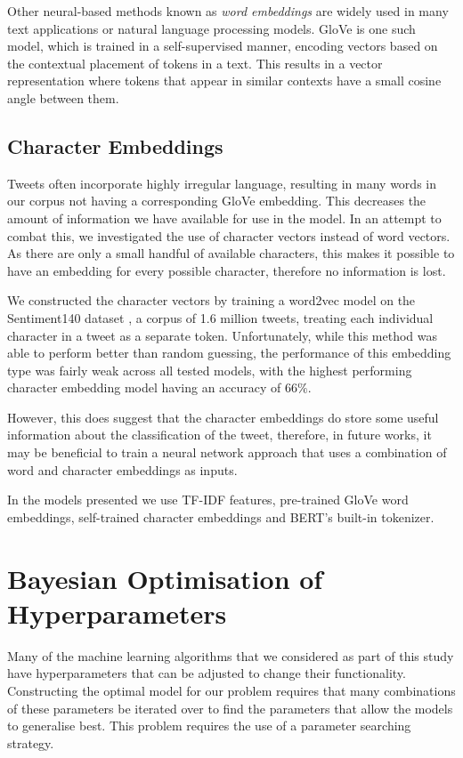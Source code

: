 \documentclass[journal, ]{IEEEtran}
\let\MYoriglatexcaption\caption
\renewcommand{\caption}[2][\relax]{\MYoriglatexcaption[#2]{#2}}
\begin{document}
Other neural-based methods known as \textit{word embeddings} are widely used in many text applications or natural language processing models. GloVe \cite{pennington2014} is one such model,  which is trained in a self-supervised manner, encoding vectors based on the contextual placement of tokens in a text. This results in a vector representation where tokens that appear in similar contexts have a small cosine angle between them. 


\subsection{Character Embeddings}
Tweets often incorporate highly irregular language, resulting in many words in our corpus not having a corresponding GloVe embedding. This decreases the amount of information we have available for use in the model. In an attempt to combat this, we investigated the use of character vectors instead of word vectors. As there are only a small handful of available characters, this makes it possible to have an embedding for every possible character, therefore no information is lost.

We constructed the character vectors by training a word2vec model on the Sentiment140 dataset \cite{go2009twitter}, a corpus of 1.6 million tweets, treating each individual character in a tweet as a separate token. Unfortunately, while this method was able to perform better than random guessing, the performance of this embedding type was fairly weak across all tested models, with the highest performing character embedding model having an accuracy of $66\%$. 

However, this does suggest that the character embeddings do store some useful information about the classification of the tweet, therefore, in future works, it may be beneficial to train a neural network approach that uses a combination of word and character embeddings as inputs.

In the models presented we use TF-IDF features, pre-trained GloVe word embeddings, self-trained character embeddings and BERT's built-in tokenizer.

\section{Bayesian Optimisation of Hyperparameters}
Many of the machine learning algorithms that we considered as part of this study have hyperparameters that can be adjusted to change their functionality. Constructing the optimal model for our problem requires that many combinations of these parameters be iterated over to find the parameters that allow the models to generalise best. This problem requires the use of a parameter searching strategy.
\end{document}
